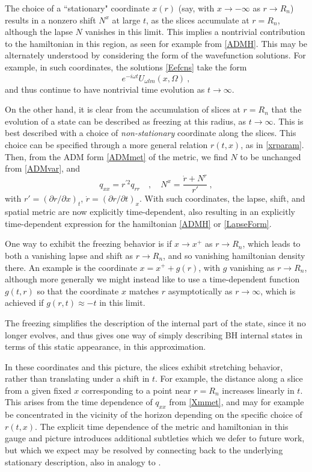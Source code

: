 \documentclass[12pt]{article}
\numberwithin{equation}{section}
\newcommand{\beq}{\begin{equation}}
\newcommand{\eeq}{\end{equation}}
\begin{document}
The choice of a ``stationary" coordinate $x(r)$ (say, with $x\rightarrow -\infty$ as $r\rightarrow R_n$) results in a nonzero shift $N^x$ at large $t$, as the slices accumulate at $r=R_n$, although the lapse $N$ vanishes in this limit.  This implies a nontrivial contribution to the hamiltonian in this region, as seen for example from \eqref{ADMH}.  This may be alternately understood by considering the form of the wavefunction solutions.  For example, in such coordinates, the solutions \eqref{Eefcns} take the form 
\beq
e^{-i\omega t} U_{\omega lm}(x,\Omega)\ ,
\eeq
and thus continue to have nontrivial time evolution as $t\rightarrow\infty$.

On the other hand, it is clear from the accumulation of slices at $r=R_n$ that the evolution of a state can be described as freezing\cite{QBHB}\cite{BHQIUE} at this radius, as $t\rightarrow \infty$.  This is best described with a choice of {\it non-stationary} coordinate along the slices.  This choice can be specified through a more general relation $r(t,x)$, as in \eqref{xrparam}.  Then, from the ADM form \eqref{ADMmet} of the metric, we find $N$ to be unchanged from \eqref{ADMvar}, and
\beq\label{Xmmet}
q_{xx}=r^{\prime 2} q_{rr}\quad ,\quad N^x = \frac{\dot r + N^r}{r'}\ ,
\eeq
with $r'=(\partial r/\partial x)_t$, $\dot r= (\partial r/\partial t)_x$.  With such coordinates, the lapse, shift, and spatial metric are now explicitly time-dependent, also resulting in an explicitly time-dependent expression for the hamiltonian \eqref{ADMH} or \eqref{LapseForm}.  

One way to exhibit the freezing behavior is if $x\rightarrow x^+$ as $r\rightarrow R_n$, which leads to both a vanishing lapse and shift as $r\rightarrow R_n$, and so vanishing hamiltonian density there.  An example\cite{SE2d} is the coordinate $x=x^+ + g(r)$, with $g$ vanishing as $r\rightarrow R_n$, although more generally we might  instead like to use a time-dependent function $g(t,r)$ so that the coordinate $x$ matches $r$ asymptotically as $r\rightarrow\infty$, which is achieved if $g(r,t)\approx -t$ in this limit.  

The freezing simplifies the description of the internal part of the state, since it no longer evolves, and thus gives one way of simply describing BH internal states in terms of this static appearance, in this approximation.  

In these coordinates and this picture, the slices exhibit stretching behavior, rather than translating under a shift in $t$.  For example, the distance along a slice from a given fixed $x$ corresponding to a point near $r=R_n$ increases linearly in $t$.  This arises from the time dependence of $q_{xx}$ from \eqref{Xmmet}, and may for example be concentrated in the vicinity of the horizon depending on the specific choice of $r(t,x)$.  
 The explicit time dependence of the metric and hamiltonian in this gauge  and picture introduces additional subtleties which we defer to future work, but which we expect may be resolved by connecting back to the underlying stationary description, also in analogy to \cite{MuOe}.  
\end{document}
